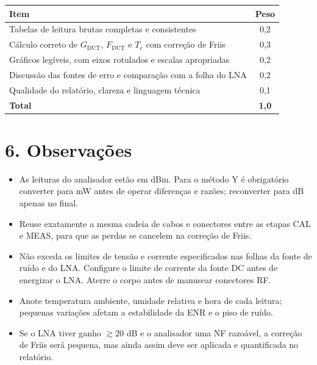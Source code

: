 \documentclass[11pt,a4paper]{article}
\begin{document}
\begin{center}
\begin{tabular}{lc}
\toprule
\textbf{Item} & \textbf{Peso} \\
\midrule
Tabelas de leitura brutas completas e consistentes                          & 0{,}2 \\
Cálculo correto de $G_{\text{DUT}}$, $F_{\text{DUT}}$ e $T_e$ com correção de Friis & 0{,}3 \\
Gráficos legíveis, com eixos rotulados e escalas apropriadas                & 0{,}2 \\
Discussão das fontes de erro e comparação com a folha do LNA                & 0{,}2 \\
Qualidade do relatório, clareza e linguagem técnica                         & 0{,}1 \\
\midrule
\textbf{Total}                                                              & \textbf{1{,}0} \\
\bottomrule
\end{tabular}
\end{center}

\section*{6. Observações}

\begin{atencao}
\begin{itemize}[leftmargin=1.5em]
  \item As leituras do analisador estão em dBm. Para o método Y é obrigatório converter para mW antes de operar diferenças e razões; reconverter para dB apenas no final.
  \item Reuse exatamente a mesma cadeia de cabos e conectores entre as etapas CAL e MEAS, para que as perdas se cancelem na correção de Friis.
  \item Não exceda os limites de tensão e corrente especificados nas folhas da fonte de ruído e do LNA. Configure o limite de corrente da fonte DC antes de energizar o LNA. Aterre o corpo antes de manusear conectores RF.
  \item Anote temperatura ambiente, umidade relativa e hora de cada leitura; pequenas variações afetam a estabilidade da ENR e o piso de ruído.
  \item Se o LNA tiver ganho $\gtrsim 20$ dB e o analisador uma NF razoável, a correção de Friis será pequena, mas ainda assim deve ser aplicada e quantificada no relatório.
\end{itemize}
\end{atencao}
\end{document}
